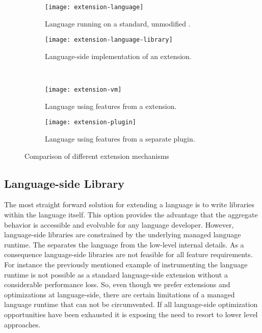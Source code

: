 \begin{figure}[h]
	\centering
	\begin{subfigure}[t]{0.45\textwidth}
		\centering
		\texttt{[image: extension-language]}
		\caption{Language running on a standard, unmodified \VM.}
	\end{subfigure}\hspace{0.09\textwidth}
	\begin{subfigure}[t]{0.45\textwidth}
		\centering
		\texttt{[image: extension-language-library]}
		\caption{Language-side implementation of an extension.}
	\end{subfigure} \\
	\vspace{\baselineskip}
	\begin{subfigure}[b]{0.45\textwidth}
		\centering
		\texttt{[image: extension-vm]}
		\caption{Language using features from a \VM extension.}
	\end{subfigure}\hspace{0.09\textwidth}
	\begin{subfigure}[b]{0.45\textwidth}
		\centering
		\texttt{[image: extension-plugin]}
		\caption{Language using features from a separate \VM plugin.}
	\end{subfigure}
	
	\caption[Language Extension Mechanisms]{Comparison of different extension mechanisms}
\end{figure}

\subsection{Language-side Library}

The most straight forward solution for extending a language is to write libraries within the language itself. 
This option provides the advantage that the aggregate behavior is accessible and evolvable for any language developer.
However, language-side libraries are constrained by the underlying managed language runtime.
The \VM separates the language from the low-level internal details.
As a consequence language-side libraries are not feasible for all feature requirements.
For instance the previously mentioned example of instrumenting the language runtime is not possible as a standard language-side extension without a considerable performance loss.
So, even though we prefer extensions and optimizations at language-side, there are certain limitations of a managed language runtime that can not be circumvented.
If all language-side optimization opportunities have been exhausted it is exposing the need to resort to lower level approaches.

